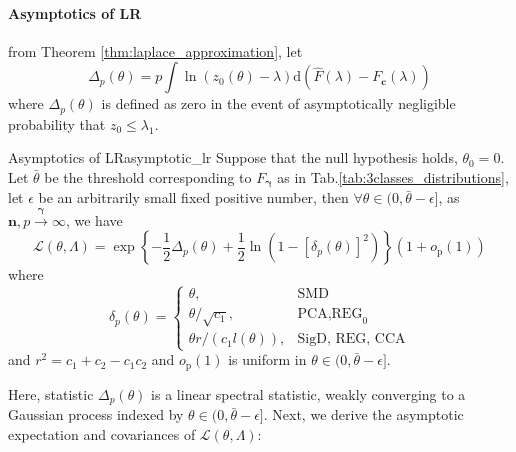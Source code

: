 \documentclass[twoside]{article}
\begin{document}
\paragraph*{Asymptotics of LR} from Theorem \ref{thm:laplace_approximation}, let 
$$
\Delta_p(\theta) = p\int \ln(z_0(\theta)-\lambda) \mathrm{d}\left( \hat{F}(\lambda) -F_{\mathbf{c}}(\lambda) \right)
$$
where $\Delta_p(\theta)$ is defined as zero in the event of asymptotically negligible probability that $z_0\leq \lambda_1$. 

\begin{theorem}{Asymptotics of LR}{asymptotic_lr}
    Suppose that the null hypothesis holds, $\theta_0= 0$. Let $\bar{\theta}$ be the threshold corresponding to $F_{\boldsymbol{\gamma}}$ as in Tab.\ref{tab:3classes_distributions}, let $\epsilon$ be an arbitrarily small fixed positive number, then $\forall \theta\in (0,\bar{\theta}-\epsilon]$, as $\mathbf{n},p\xrightarrow{\boldsymbol{\gamma}} \infty$, we have 
    $$
    \mathcal{L}(\theta,\Lambda) = \exp\left\{ -\frac{1}{2}\Delta_p(\theta) + \frac{1}{2}\ln \left(1-[\delta_p(\theta)]^2\right) \right\} (1+o_{\mathrm{p}}(1))
    $$
    where 
    $$
    \delta_p(\theta) = \begin{cases}
        \theta, &\text{SMD}\\
        \theta/\sqrt{c_1}, & \text{PCA,REG}_0\\
        \theta r/(c_1l(\theta)), & \text{SigD, REG, CCA}
    \end{cases}
    $$
    and $r^2 = c_1 + c_2 - c_1c_2$ and $o_{\mathrm{p}}(1)$ is uniform in $\theta \in (0,\bar{\theta}-\epsilon]$.
\end{theorem}

Here, statistic $\Delta_p(\theta)$ is a linear spectral statistic, weakly converging to a Gaussian process indexed by $\theta \in (0,\bar{\theta}-\epsilon]$. Next, we derive the asymptotic expectation and covariances of $\mathcal{L}(\theta,\Lambda)$:
\end{document}
